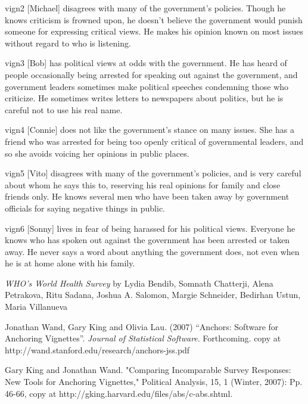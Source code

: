 \begin{Details}
{\item[vign2] [Michael] disagrees with many of the government's
policies. Though he knows criticism is frowned upon, he doesn't
believe the government would punish someone for expressing critical
views. He makes his opinion known on most issues without regard to
who is listening.

\item[vign3] [Bob] has political views at odds with the
government. He has heard of people occasionally being arrested for
speaking out against the government, and government leaders
sometimes make political speeches condemning those who criticize. He
sometimes writes letters to newspapers about politics, but he is
careful not to use his real name.

\item[vign4] [Connie] does not like the government's stance on many
issues. She has a friend who was arrested for being too openly
critical of governmental leaders, and so she avoids voicing her
opinions in public places.

\item[vign5] [Vito] disagrees with many of the government's
policies, and is very careful about whom he says this to, reserving
his real opinions for family and close friends only. He knows
several men who have been taken away by government officials for
saying negative things in public.

\item[vign6] [Sonny] lives in fear of being harassed for his
political views. Everyone he knows who has spoken out against the
government has been arrested or taken away. He never says a word
about anything the government does, not even when he is at home
alone with his family. 
}
\end{Details}
\begin{References}\relax
\emph{WHO's World Health Survey}
by Lydia Bendib, Somnath Chatterji, Alena Petrakova, Ritu Sadana,
Joshua A. Salomon, Margie Schneider, Bedirhan Ustun, Maria
Villanueva

Jonathan Wand, Gary King and Olivia Lau. (2007) ``Anchors: Software for
Anchoring Vignettes''. \emph{Journal of Statistical Software}.  Forthcoming.
copy at http://wand.stanford.edu/research/anchors-jss.pdf

Gary King and Jonathan Wand.  "Comparing Incomparable Survey
Responses: New Tools for Anchoring Vignettes," Political Analysis, 15,
1 (Winter, 2007): Pp. 46-66,
copy at http://gking.harvard.edu/files/abs/c-abs.shtml.
\end{References}


